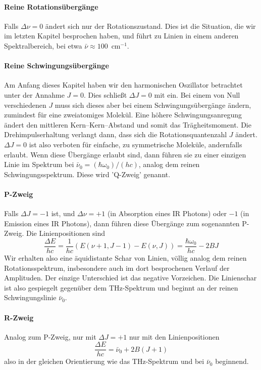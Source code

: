 \paragraph{Reine Rotationsübergänge} Falls $\Delta \nu = 0$ ändert sich nur der Rotationszustand. Dies ist die Situation, die wir im letzten Kapitel besprochen haben, und führt zu Linien  in einem anderen Spektralbereich, bei etwa $\bar{\nu} \approx 100$~cm$^{-1}$.

\paragraph{Reine Schwingungsübergänge} Am Anfang dieses Kapitel haben wir den  harmonischen Oszillator betrachtet unter der Annahme $J=0$. Dies schließt $\Delta J = 0$ mit ein. Bei einem von Null verschiedenen $J$ muss sich dieses aber bei einem Schwingungsübergänge ändern, zumindest für eine zweiatomiges Molekül. Eine höhere Schwingungsanregung ändert den mittleren Kern--Kern--Abstand und somit das Trägheitsmoment. Die Drehimpulserhaltung verlangt dann, dass sich die Rotationsquantenzahl $J$ ändert. $\Delta J = 0$ ist also verboten für einfache, zu symmetrische Moleküle, andernfalls erlaubt. Wenn diese Übergänge erlaubt sind, dann führen sie zu einer einzigen Linie im Spektrum bei $ \bar{\nu}_0 = (\hbar \omega_0)/(h c) $, analog dem reinen Schwingungsspektrum. Diese wird 'Q-Zweig' genannt. 

\paragraph{P-Zweig} Falls $\Delta J = -1$ ist, und $\Delta \nu = +1$ (in Absorption eines IR Photons) oder $-1$ (in Emission eines IR Photons), dann führen diese Übergänge zum sogenannten P-Zweig. Die Linienpositionen sind
\begin{equation}
 \frac{\Delta E}{h c} = \frac{1}{h c} \left( E(\nu +1, J -1) - E(\nu, J) \right) = \frac{\hbar \omega_0}{h c}   - 2 B J
\end{equation}
Wir erhalten also eine äquidistante Schar von Linien, völlig analog dem reinen Rotationsspektrum, insbesondere auch im dort besprochenen Verlauf der Amplituden. Der einzige Unterschied ist das negative Vorzeichen. Die Linienschar ist also gespiegelt gegenüber dem THz-Spektrum und beginnt an der reinen Schwingungslinie $\bar{\nu}_0 $.

\paragraph{R-Zweig} Analog zum P-Zweig, nur mit  $\Delta J = +1$ nur mit den Linienpositionen
\begin{equation}
 \frac{\Delta E}{h c} =  \bar{\nu}_0   + 2 B ( J +1)
\end{equation}
also in der gleichen Orientierung wie das THz-Spektrum und bei $\bar{\nu}_0 $ beginnend.

